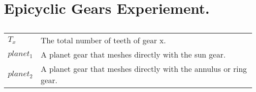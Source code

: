 \section*{Epicyclic Gears Experiement.}
\begin{table}[H]
\begin{tabular}{ll}
$T_x$    & The total number of teeth of gear x.                                    \\          
$planet_1$    &  A planet gear that meshes directly with the sun gear.                                 \\
$planet_2$  & A planet gear that meshes directly with the annulus or ring gear. \\   
\end{tabular}
\caption*{}
\label{tab:my-table}
\end{table}